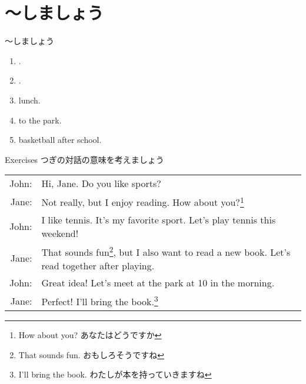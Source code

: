 \documentclass[aspectratio=169,xcolor={dvipsnames,table}]{beamer}
\begin{document}
\section{～しましょう}
\begin{frame}[plain]{～しましょう}
 \begin{enumerate}
  \item<1->  .
  \item<2->  .
  \item<3->   lunch. 
  \item<4->   to the park.
  \item<5->   basketball after school.
 \end{enumerate}

\hfill{}
\end{frame}
\begin{frame}[plain]{Exercises}
つぎの対話の意味を考えましょう\hfill{}


\begin{tabular}{rp{}}
John:& Hi, Jane. Do you like sports?\\
Jane:& Not really, but I enjoy reading. How about you?\footnote{How about you? あなたはどうですか}\\
John:& I like tennis. It's my favorite sport. Let's play tennis this weekend!\\
Jane:& That sounds fun\footnote{That sounds fun. おもしろそうですね}, but I also want to read a new book. Let's read together after playing.\\
John:& Great idea! Let's meet at the park at 10 in the morning.\\
Jane:& Perfect! I'll bring the book.\footnote{I'll bring the book. わたしが本を持っていきますね}
\end{tabular}

\end{frame}
\end{document}

